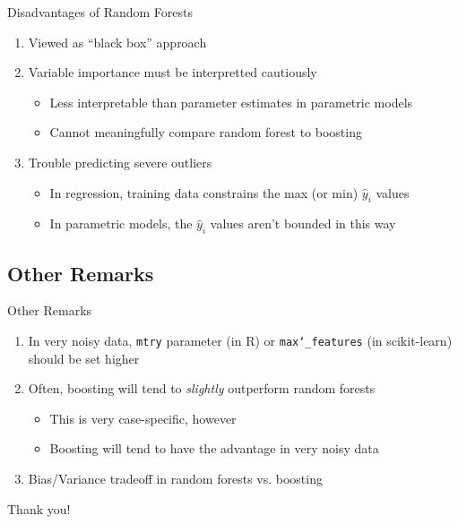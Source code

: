 \documentclass[pdf]{beamer}
\begin{document}
		\begin{frame}{Disadvantages of Random Forests}
			\begin{enumerate}
				\item Viewed as ``black box'' approach
				\item Variable importance must be interpretted cautiously
					\begin{itemize}
						\item Less interpretable than parameter estimates in parametric models
						\item Cannot meaningfully compare random forest to boosting 
					\end{itemize}  
				\item Trouble predicting severe outliers
					\begin{itemize}
						\item In regression, training data constrains the max (or min) $\hat{y}_i$ values 
						\item In parametric models, the $\hat{y}_i$ values aren't bounded in this way
					\end{itemize}
				
			\end{enumerate}
		\end{frame}
	
	\subsection{Other Remarks}
		\begin{frame}{Other Remarks}
			\begin{enumerate}
				\item In very noisy data, \texttt{mtry} parameter (in R) or \texttt{max\char`_features} (in scikit-learn) should be set higher
				\item Often, boosting will tend to \textit{slightly} outperform random forests
					\begin{itemize}
						\item This is very case-specific, however
						\item Boosting will tend to have the advantage in very noisy data
					\end{itemize}
				\item Bias/Variance tradeoff in random forests vs. boosting
				
				
			\end{enumerate}
		\end{frame}
		
	\begin{frame}{\hspace{3 mm}}
		\begin{center}
			Thank you!
		\end{center}
	\end{frame} 
		
		
		
\end{document}
